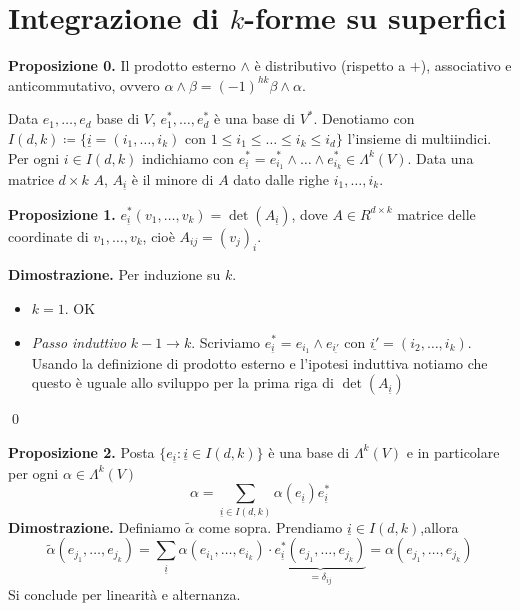 \section{Integrazione di $k$-forme su superfici}

\textbf{Proposizione 0.} Il prodotto esterno $\wedge$ è distributivo (rispetto a $+$), associativo e anticommutativo, ovvero $\alpha \wedge \beta = (-1)^{hk} \beta \wedge \alpha$.

Data $e_1,\ldots,e_d$ base di $V$, $e_1^*,\ldots,e_d^*$ è una base di $V^*$.
Denotiamo con $I(d,k) \coloneqq \{ \underline{i} = (i_1,\ldots,i_k) \text{ con } 1 \leq i_1 \leq \ldots \leq i_k \leq i_d \}$ l'insieme di multiindici.
Per ogni $i \in I(d,k)$ indichiamo con $e_{\underline{i}}^* = e_{i_1}^* \wedge \ldots \wedge e_{i_k}^* \in \Lambda^k(V)$. Data una matrice $d \times k$ $A$, $A_{\underline{i}}$ è il minore di $A$ dato dalle righe $i_1,\ldots,i_k$.

\textbf{Proposizione 1.} $e_{\underline{i}}^* (v_1,\ldots,v_k) = \det(A_{\underline{i}})$, dove $A \in R^{d\times k}$ matrice delle coordinate di $v_1,\ldots,v_k$, cioè $A_{ij} = (v_j)_i$.

\textbf{Dimostrazione.} Per induzione su $k$.
\begin{itemize}

	\item $k=1$. OK

	\item \textit{Passo induttivo} $k-1 \to k$. Scriviamo $e_{\underline{i}}^* = e_{i_1} \wedge e_{\underline{i'}}$ con $\underline{i'} = (i_2,\ldots,i_k)$.
	Usando la definizione di prodotto esterno e l'ipotesi induttiva notiamo che questo è uguale allo sviluppo per la prima riga di $\det(A_{\underline{i}})$

\end{itemize}
\qed

\textbf{Proposizione 2.} Posta $\{e_{\underline{i}} \colon \underline{i} \in I(d,k) \}$ è una base di $\Lambda^k(V)$ e in particolare per ogni $\alpha \in \Lambda^k(V)$
%
$$
	\alpha = \sum_{\underline{i} \in I(d,k)} \alpha(e_{\underline{i}}) e_{\underline{i}}^* 
$$
%
\textbf{Dimostrazione.} Definiamo $\tilde{\alpha}$ come sopra. Prendiamo $\underline{i} \in I(d,k)$,allora
%
$$
\tilde{\alpha}(e_{j_1},\ldots,e_{j_k}) = \sum_{\underline{i}} \alpha \left( e_{i_1},\ldots,e_{i_k} \right) \cdot \underbrace{e_{\underline{i}}^* (e_{j_1},\ldots,e_{j_k})}_{= \delta_{ij}} = \alpha (e_{j_1},\ldots,e_{j_k})
$$
%
Si conclude per linearità e alternanza.

